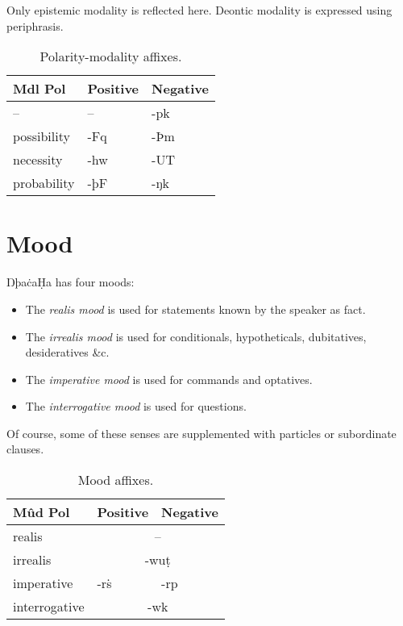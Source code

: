 \documentclass{book}
\newcommand{\lname}{ŊþaċaḤa}
\begin{document}
Only epistemic modality is reflected here. Deontic modality is expressed using periphrasis.

\begin{table}[h!]
  \caption{Polarity-modality affixes.}
  \centering
  \begin{tabular}{l|ll}
    Mdl \bs{} Pol & Positive & Negative \\
    \hline
    -- & -- & -pk \\
    possibility & -Fq & -Þm \\
    necessity & -hw & -UT \\
    probability & -þF & -ŋk \\
  \end{tabular}
\end{table}

\section{Mood}

\lname{} has four moods:

\begin{itemize}
  \item The \emph{realis mood} is used for statements known by the speaker as fact.
  \item The \emph{irrealis mood} is used for conditionals, hypotheticals, dubitatives, desideratives \&c.
  \item The \emph{imperative mood} is used for commands and optatives.
  \item The \emph{interrogative mood} is used for questions.
\end{itemize}

Of course, some of these senses are supplemented with particles or subordinate clauses.

\begin{table}[h!]
  \caption{Mood affixes.}
  \centering
  \begin{tabular}{l|ll}
    Mûd \bs{} Pol & Positive & Negative \\
    \hline
    realis & \multicolumn{2}{c}{--} \\
    irrealis & \multicolumn{2}{c}{-wuṭ} \\
    imperative & -rṡ & -rp \\
    interrogative & \multicolumn{2}{c}{-wk} \\
  \end{tabular}
\end{table}

\appendix
\end{document}
